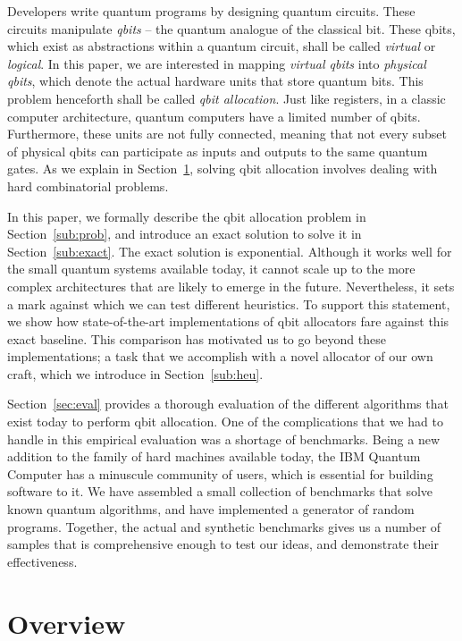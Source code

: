 \documentclass[sigplan,10pt,review,anonymous]{acmart}\settopmatter{printfolios=true}
\begin{document}
Developers write quantum programs by designing quantum circuits.
These circuits manipulate {\em qbits} -- the quantum analogue of the classical
bit.
These qbits, which exist as abstractions within a quantum circuit, shall be
called {\em virtual} or {\em logical}.
In this paper, we are interested in mapping {\em virtual qbits}
into {\em physical qbits}, which denote the actual hardware units that store
quantum bits.
This problem henceforth shall be called {\em qbit allocation}.
Just like registers, in a classic computer architecture, quantum computers
have a limited number of qbits.
Furthermore, these units are not fully connected, meaning that not every
subset of physical qbits can participate as inputs and outputs to the same
quantum gates.
As we explain in Section~\ref{sec:ovr}, solving qbit allocation involves
dealing with hard combinatorial problems.

In this paper, we formally describe the qbit allocation problem in
Section~\ref{sub:prob}, and introduce an exact solution to solve it in
Section~\ref{sub:exact}.
The exact solution is exponential.
Although it works well for the small quantum systems available today, it cannot
scale up to the more complex architectures that are likely to emerge in the
future.
Nevertheless, it sets a mark against which we can test different heuristics.
To support this statement, we show how state-of-the-art implementations of qbit
allocators fare against this exact baseline.
This comparison has motivated us to go beyond these implementations;
a task that we accomplish with a novel allocator of our own craft, which we
introduce in Section~\ref{sub:heu}.

Section~\ref{sec:eval} provides a thorough evaluation of the different
algorithms that exist today to perform qbit allocation.
One of the complications that we had to handle in this empirical evaluation was
a shortage of benchmarks.
Being a new addition to the family of hard machines available today, the IBM
Quantum Computer has a minuscule community of users, which is essential for
building software to it.
We have assembled a small collection of benchmarks that solve known quantum
algorithms, and have implemented a generator of random programs.
Together, the actual and synthetic benchmarks gives us a number of samples
that is comprehensive enough to test our ideas, and demonstrate their
effectiveness.

\section{Overview}
\label{sec:ovr}
\end{document}
